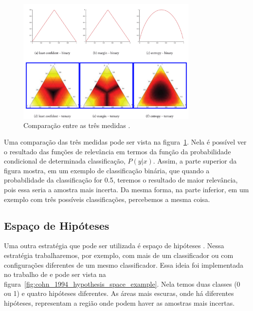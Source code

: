 \begin{figure}
  \centering
  \includegraphics[width=0.8\textwidth]{figures/settles_2014_uncertainty_medidas.png}
  \caption{Comparação entre as três medidas \citep{settles2014active}.}
  \label{fig:settles_2014_uncertainty_medidas}
\end{figure}



Uma comparação das três medidas pode ser vista na figura~\ref{fig:settles_2014_uncertainty_medidas}. Nela é possível ver o resultado das funções de relevância em termos da função da probabilidade condicional de determinada classificação, $P(y\lvert x)$. Assim, a parte superior da figura mostra, em um exemplo de classificação binária, que quando a probabilidade da classificação for 0.5, teremos o resultado de maior relevância, pois essa seria a amostra mais incerta. Da mesma forma, na parte inferior, em um exemplo com três possíveis classificações, percebemos a mesma coisa. 


\subsection{Espaço de Hipóteses} 
\label{sec:hypothesis_space}

Uma outra estratégia que pode ser utilizada é %
 espaço de hipóteses \citep{mitchell1978version, mitchell1982generalization}. Nessa estratégia trabalharemos, por exemplo, com mais de um classificador ou com configurações diferentes de um mesmo classificador.  Essa ideia foi implementada no trabalho de \citep{atlas1990training,cohn1994improving} e pode ser vista na figura~\ref{fig:cohn_1994_hypothesis_space_example}. Nela temos duas classes (0 ou 1) e quatro hipóteses diferentes. As áreas mais escuras, onde há %
 diferentes hipóteses, representam a região onde podem haver as amostras mais incertas. 

